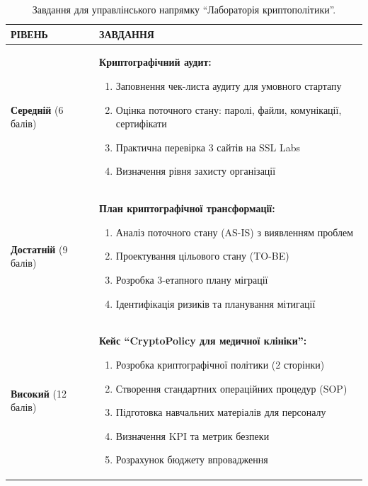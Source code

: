 \begin{table}[h!]
\caption{Завдання для управлінського напрямку ``Лабораторія криптополітики''.}
\label{tab:lab2_manag_task} %
\noindent %

\begin{tabular}{
  | >{\raggedright\arraybackslash}p{} 
  | >{\raggedright\arraybackslash}p{} |
}
\hline

\rowcolor{TableHeaderBrown}
\hfil \color{white}\textbf{РІВЕНЬ} & 
\hfil \color{white}\textbf{ЗАВДАННЯ} \\ \hline

\cellcolor{TableBodyPeach}
\textbf{Середній} (6 балів) &
\textbf{Криптографічний аудит:}
    \begin{enumerate}
        \item Заповнення чек-листа аудиту для умовного стартапу
        \item Оцінка поточного стану: паролі, файли, комунікації, сертифікати
        \item Практична перевірка 3 сайтів на SSL Labs
        \item Визначення рівня захисту організації
    \end{enumerate}
 \\ \hline

\cellcolor{TableBodyPeach}
\textbf{Достатній} (9 балів) &
\textbf{План криптографічної трансформації:}
\begin{enumerate}
    \item Аналіз поточного стану (AS-IS) з виявленням проблем
    \item Проектування цільового стану (TO-BE)
    \item Розробка 3-етапного плану міграції
    \item Ідентифікація ризиків та планування мітигації
\end{enumerate} \\ \hline

\cellcolor{TableBodyPeach}
\textbf{Високий} (12 балів) &
\textbf{Кейс ``CryptoPolicy для медичної клініки'':}
\begin{enumerate}
    \item Розробка криптографічної політики (2 сторінки)
    
    \item Створення стандартних операційних процедур (SOP)
    \item Підготовка навчальних матеріалів для персоналу
    \item Визначення KPI та метрик безпеки
    \item Розрахунок бюджету впровадження
\end{enumerate} \\ \hline

\end{tabular}
\end{table}

